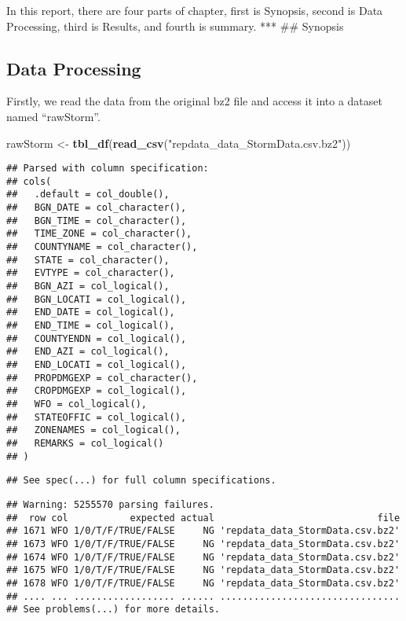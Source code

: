 \documentclass[
]{article}
\newenvironment{Shaded}{\begin{snugshade}}{\end{snugshade}}
\newcommand{\KeywordTok}[1]{\textcolor[rgb]{0.13,0.29,0.53}{\textbf{#1}}}
\newcommand{\NormalTok}[1]{#1}
\newcommand{\StringTok}[1]{\textcolor[rgb]{0.31,0.60,0.02}{#1}}
\begin{document}
In this report, there are four parts of chapter, first is Synopsis,
second is Data Processing, third is Results, and fourth is summary. ***
\#\# Synopsis

\hypertarget{data-processing}{%
\subsection{Data Processing}\label{data-processing}}

Firstly, we read the data from the original bz2 file and access it into
a dataset named ``rawStorm''.

\begin{Shaded}
\begin{Highlighting}[]
\NormalTok{rawStorm <-}\StringTok{ }\KeywordTok{tbl_df}\NormalTok{(}\KeywordTok{read_csv}\NormalTok{(}\StringTok{"repdata_data_StormData.csv.bz2"}\NormalTok{))}
\end{Highlighting}
\end{Shaded}

\begin{verbatim}
## Parsed with column specification:
## cols(
##   .default = col_double(),
##   BGN_DATE = col_character(),
##   BGN_TIME = col_character(),
##   TIME_ZONE = col_character(),
##   COUNTYNAME = col_character(),
##   STATE = col_character(),
##   EVTYPE = col_character(),
##   BGN_AZI = col_logical(),
##   BGN_LOCATI = col_logical(),
##   END_DATE = col_logical(),
##   END_TIME = col_logical(),
##   COUNTYENDN = col_logical(),
##   END_AZI = col_logical(),
##   END_LOCATI = col_logical(),
##   PROPDMGEXP = col_character(),
##   CROPDMGEXP = col_logical(),
##   WFO = col_logical(),
##   STATEOFFIC = col_logical(),
##   ZONENAMES = col_logical(),
##   REMARKS = col_logical()
## )
\end{verbatim}

\begin{verbatim}
## See spec(...) for full column specifications.
\end{verbatim}

\begin{verbatim}
## Warning: 5255570 parsing failures.
##  row col           expected actual                             file
## 1671 WFO 1/0/T/F/TRUE/FALSE     NG 'repdata_data_StormData.csv.bz2'
## 1673 WFO 1/0/T/F/TRUE/FALSE     NG 'repdata_data_StormData.csv.bz2'
## 1674 WFO 1/0/T/F/TRUE/FALSE     NG 'repdata_data_StormData.csv.bz2'
## 1675 WFO 1/0/T/F/TRUE/FALSE     NG 'repdata_data_StormData.csv.bz2'
## 1678 WFO 1/0/T/F/TRUE/FALSE     NG 'repdata_data_StormData.csv.bz2'
## .... ... .................. ...... ................................
## See problems(...) for more details.
\end{verbatim}
\end{document}

